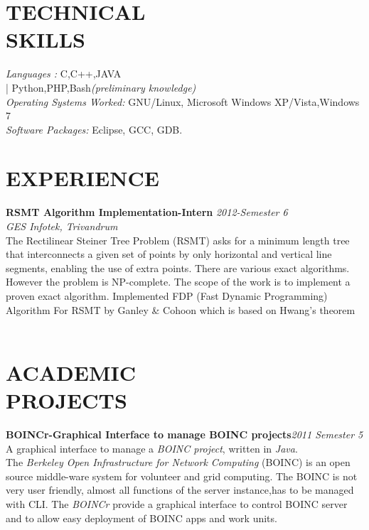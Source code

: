 \documentclass[line,margin]{res}
\begin{document}
\begin{resume}
  \section{TECHNICAL \\ SKILLS} 
	  {\it Languages :} C,C++,JAVA\\
          |\hspace{15 mm} Python,PHP,Bash{\it (preliminary knowledge)}\\
          {\it Operating Systems Worked:} GNU/Linux, Microsoft Windows XP/Vista,Windows 7\\
	  {\it Software Packages:} Eclipse, GCC, GDB.
	  
   \section{EXPERIENCE}
           
	   {\bf RSMT Algorithm Implementation-Intern }\hfill {\it 2012-Semester 6 } \\
	   {\it GES Infotek, Trivandrum } \\

           The Rectilinear Steiner Tree Problem (RSMT) asks for a minimum length tree that interconnects a given set of points by only horizontal and vertical line segments, enabling the use of extra points. There are various exact algorithms. However the problem is NP-complete. The scope of the work is to implement a proven exact algorithm. Implemented FDP (Fast Dynamic Programming) Algorithm For RSMT by Ganley \& Cohoon which is based on Hwang’s theorem\\\\

    \section{ACADEMIC \\ PROJECTS}
            {\bf BOINCr-Graphical Interface to manage BOINC projects}\hfill {\it 2011 Semester 5}\\

            A graphical interface to manage a {\it BOINC project}, written in {\it Java}.\\
            The {\it Berkeley Open Infrastructure for Network Computing }(BOINC) is an open source middle-ware system for volunteer and grid computing. The BOINC is not very user friendly, almost all functions of the server instance,has to be managed with CLI. The {\it BOINCr} provide a graphical interface to control BOINC server and to allow easy deployment of BOINC apps and work units.\\\\


\end{resume}
\end{document}

